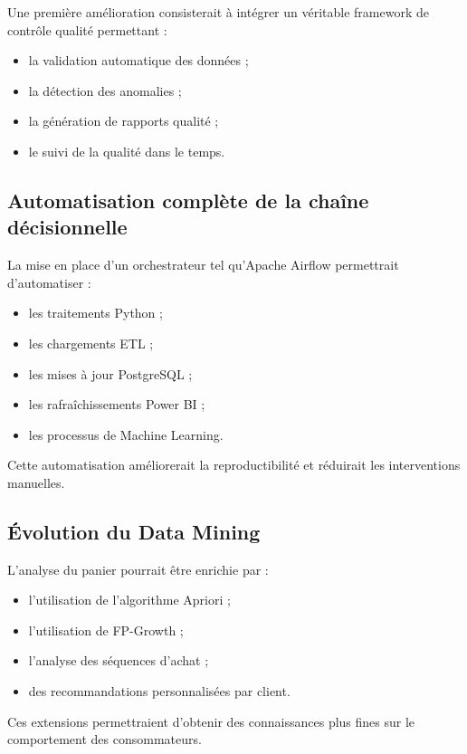 \documentclass[12pt,a4paper,twoside]{report}
\begin{document}
Une première amélioration consisterait à intégrer un véritable framework de contrôle qualité permettant :

\begin{itemize}
    \item la validation automatique des données ;
    \item la détection des anomalies ;
    \item la génération de rapports qualité ;
    \item le suivi de la qualité dans le temps.
\end{itemize}

\subsection{Automatisation complète de la chaîne décisionnelle}

La mise en place d'un orchestrateur tel qu'Apache Airflow permettrait d'automatiser :

\begin{itemize}
    \item les traitements Python ;
    \item les chargements ETL ;
    \item les mises à jour PostgreSQL ;
    \item les rafraîchissements Power BI ;
    \item les processus de Machine Learning.
\end{itemize}

Cette automatisation améliorerait la reproductibilité et réduirait les interventions manuelles.

\subsection{Évolution du Data Mining}

L'analyse du panier pourrait être enrichie par :

\begin{itemize}
    \item l'utilisation de l'algorithme Apriori ;
    \item l'utilisation de FP-Growth ;
    \item l'analyse des séquences d'achat ;
    \item des recommandations personnalisées par client.
\end{itemize}

Ces extensions permettraient d'obtenir des connaissances plus fines sur le comportement des consommateurs.
\end{document}
